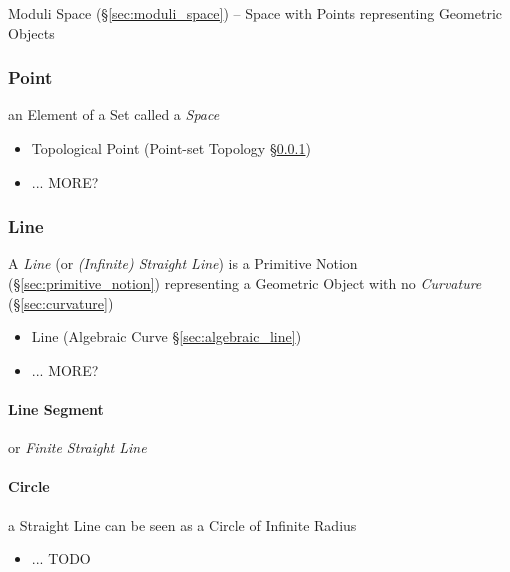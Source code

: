 \fist Moduli Space (\S\ref{sec:moduli_space}) -- Space with Points representing
Geometric Objects



\subsubsection{Point}\label{sec:point}

an Element of a Set called a \emph{Space}

\begin{itemize}
  \item Topological Point (Point-set Topology \S\ref{sec:point})
  \item ... MORE?
\end{itemize}



\subsubsection{Line}\label{sec:line}

A \emph{Line} (or \emph{(Infinite) Straight Line}) is a Primitive Notion
(\S\ref{sec:primitive_notion}) representing a Geometric Object with no
\emph{Curvature} (\S\ref{sec:curvature})

\begin{itemize}
  \item Line (Algebraic Curve \S\ref{sec:algebraic_line})
  \item ... MORE?
\end{itemize}



\paragraph{Line Segment}\label{sec:line_segment}\hfill

or \emph{Finite Straight Line}



\paragraph{Circle}\label{sec:circle}\hfill

a Straight Line can be seen as a Circle of Infinite Radius

\begin{itemize}
  \item ... TODO
\end{itemize}



